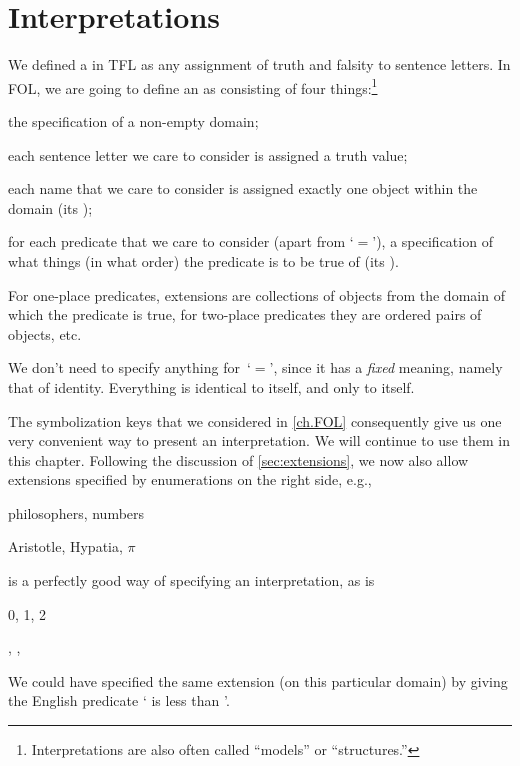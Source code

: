 \section{Interpretations}
We defined a  in TFL as any assignment of truth and
falsity to sentence letters. In FOL, we are going to define an
 as consisting of four
things:\footnote{Interpretations are also often called ``models'' or ``structures.''}
	\begin{compactlist}
		\item the specification of a non-empty domain;
		\item each sentence letter we care to consider is assigned a truth value;
		\item each name that we care to consider is assigned exactly one
		object within the domain (its );
		\item for each predicate that we care to consider (apart from
		`$=$'), a specification of what things (in what order) the
		predicate is to be true of (its ).
	\end{compactlist}
For one-place predicates, extensions are collections of objects from
the domain of which the predicate is true, for two-place predicates
they are ordered pairs of objects, etc.

We don't need to specify anything for~`$=$', since it has a
\emph{fixed} meaning, namely that of identity. Everything is identical
to itself, and only to itself. 

The symbolization keys that we considered in \cref{ch.FOL} consequently give us one very convenient way to present an interpretation. We will continue to use them in this chapter. Following the discussion of \cref{sec:extensions}, we now also allow extensions specified by enumerations on the right side, e.g.,
\begin{ekey}
	\item[\text{domain}] philosophers, numbers
	\item[\atom{H}{x}] Aristotle, Hypatia, $\pi$
\end{ekey}
is a perfectly good way of specifying an interpretation, as is
\begin{ekey}
	\item[\text{domain}] 0, 1, 2
	\item[\atom{L}{x,y}] , , 
\end{ekey}
We could have specified the same extension (on this particular domain) by giving the English predicate ` is less than '.


